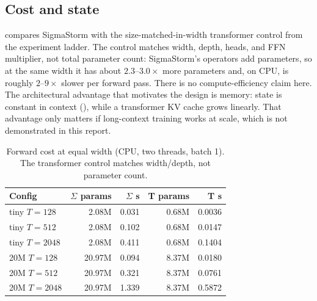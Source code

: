 \subsection{Cost and state}
\label{sec:results-cost}

 compares SigmaStorm with the size-matched-in-width transformer control from
the experiment ladder. The control matches width, depth, heads, and FFN multiplier, not total
parameter count: SigmaStorm's operators add parameters, so at the same width it has about
$2.3$--$3.0\times$ more parameters and, on CPU, is roughly $2$--$9\times$ slower per forward
pass. There is no compute-efficiency claim here. The architectural advantage that motivates the
design is memory: state is constant in context (), while a transformer KV cache
grows linearly. That advantage only matters if long-context training works at scale, which is
not demonstrated in this report.

\begin{table}[t]
\centering
\caption{Forward cost at equal width (CPU, two threads, batch 1). The transformer control
matches width/depth, not parameter count.}
\label{tab:cost}
\small
\begin{tabular}{@{}l r r r r@{}}
\toprule
Config & $\Sigma$ params & $\Sigma$ s & T params & T s \\
\midrule
tiny $T{=}128$ & 2.08M & 0.031 & 0.68M & 0.0036 \\
tiny $T{=}512$ & 2.08M & 0.102 & 0.68M & 0.0147 \\
tiny $T{=}2048$ & 2.08M & 0.411 & 0.68M & 0.1404 \\
20M $T{=}128$ & 20.97M & 0.094 & 8.37M & 0.0180 \\
20M $T{=}512$ & 20.97M & 0.321 & 8.37M & 0.0761 \\
20M $T{=}2048$ & 20.97M & 1.339 & 8.37M & 0.5872 \\
\bottomrule
\end{tabular}
\end{table}


